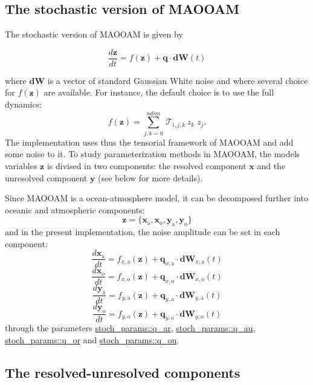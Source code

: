 \subsection*{The stochastic version of M\+A\+O\+O\+AM}

The stochastic version of M\+A\+O\+O\+AM is given by

\[ \frac{d \boldsymbol{z}}{dt} = f(\boldsymbol{z})+ \boldsymbol{q} \cdot \boldsymbol{dW} (t)\]

where $\boldsymbol{dW}$ is a vector of standard Gaussian White noise and where several choice for $f(\boldsymbol{z})$ are available. For instance, the default choice is to use the full dynamics\+: \[ f(\boldsymbol{z}) = \sum_{j,k=0}^{ndim} \, \mathcal{T}_{i,j,k} \, z_k \; z_j . \] The implementation uses thus the tensorial framework of M\+A\+O\+O\+AM and add some noise to it. To study parameterization methods in M\+A\+O\+O\+AM, the models variables $\boldsymbol z$ is divised in two components\+: the resolved component $\boldsymbol x$ and the unresolved component $\boldsymbol y$ (see below for more details).

Since M\+A\+O\+O\+AM is a ocean-\/atmosphere model, it can be decomposed further into oceanic and atmospheric components\+: \[ \boldsymbol z = \{ \boldsymbol{x}_{\text{a}}, \boldsymbol{x}_{\text{o}}, \boldsymbol{y}_{\text{a}}, \boldsymbol{y}_{\text{o}}\} \] and in the present implementation, the noise amplitude can be set in each component\+: \[ \frac{d \boldsymbol{x}_{\text{a}}}{dt} = f_{x,\text{a}}(\boldsymbol{z})+ \boldsymbol{q}_{x,\text{a}} \cdot \boldsymbol{dW}_{x,\text{a}} (t)\] \[ \frac{d \boldsymbol{x}_{\text{o}}}{dt} = f_{x,\text{o}}(\boldsymbol{z})+ \boldsymbol{q}_{x,\text{o}} \cdot \boldsymbol{dW}_{x,\text{o}} (t)\] \[ \frac{d \boldsymbol{y}_{\text{a}}}{dt} = f_{y,\text{a}}(\boldsymbol{z})+ \boldsymbol{q}_{y,\text{a}} \cdot \boldsymbol{dW}_{y,\text{a}} (t)\] \[ \frac{d \boldsymbol{y}_{\text{o}}}{dt} = f_{y,\text{o}}(\boldsymbol{z})+ \boldsymbol{q}_{y,\text{o}} \cdot \boldsymbol{dW}_{y,\text{o}} (t)\] through the parameters \hyperlink{namespacestoch__params_a56cee7780f23cbd0cc619c5b5bb30b6c}{stoch\+\_\+params\+::q\+\_\+ar}, \hyperlink{namespacestoch__params_a437fce848ee222fc34893831a54e32e9}{stoch\+\_\+params\+::q\+\_\+au}, \hyperlink{namespacestoch__params_adc17ebaeabac74e33023f9e7bb8583ec}{stoch\+\_\+params\+::q\+\_\+or} and \hyperlink{namespacestoch__params_a6b3308ad01c8ba1945332b05df447865}{stoch\+\_\+params\+::q\+\_\+ou}. 



\subsection*{The resolved-\/unresolved components}

